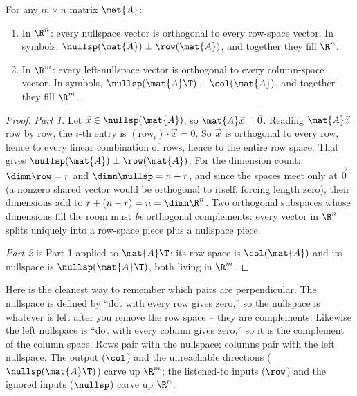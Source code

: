 \begin{theorem}\label{ch15:ortho-thm}
For any $m\times n$ matrix $\mat{A}$:
\begin{enumerate}
  \item In $\R^n$: every nullspace vector is orthogonal to every row-space vector. In symbols,
  $\nullsp(\mat{A}) \perp \row(\mat{A})$, and together they fill $\R^n$.
  \item In $\R^m$: every left-nullspace vector is orthogonal to every column-space vector. In
  symbols, $\nullsp(\mat{A}\T) \perp \col(\mat{A})$, and together they fill $\R^m$.
\end{enumerate}
\end{theorem}

\begin{proof}
\emph{Part 1.} Let $\vec{x}\in\nullsp(\mat{A})$, so $\mat{A}\vec{x}=\vec{0}$. Reading $\mat{A}\vec{x}$
row by row, the $i$-th entry is $(\text{row}_i)\cdot\vec{x}=0$. So $\vec{x}$ is orthogonal to every
row, hence to every linear combination of rows, hence to the entire row space. That gives
$\nullsp(\mat{A})\perp\row(\mat{A})$. For the dimension count: $\dimn\row=r$ and $\dimn\nullsp=n-r$,
and since the spaces meet only at $\vec{0}$ (a nonzero shared vector would be orthogonal to itself,
forcing length zero), their dimensions add to $r+(n-r)=n=\dimn\R^n$. Two orthogonal subspaces whose
dimensions fill the room must \emph{be} orthogonal complements: every vector in $\R^n$ splits
uniquely into a row-space piece plus a nullspace piece.

\emph{Part 2} is Part 1 applied to $\mat{A}\T$: its row space is $\col(\mat{A})$ and its nullspace
is $\nullsp(\mat{A}\T)$, both living in $\R^m$.
\end{proof}

\begin{intuitionbox}
Here is the cleanest way to remember which pairs are perpendicular. The nullspace is defined by
``dot with every row gives zero,'' so the nullspace is whatever is left after you remove the row
space -- they are complements. Likewise the left nullspace is ``dot with every column gives zero,''
so it is the complement of the column space. Rows pair with the nullspace; columns pair with the
left nullspace. The output ($\col$) and the unreachable directions ($\nullsp(\mat{A}\T)$) carve up
$\R^m$; the listened-to inputs ($\row$) and the ignored inputs ($\nullsp$) carve up $\R^n$.
\end{intuitionbox}

